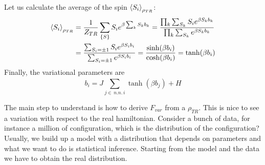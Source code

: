 \documentclass[../main/main.tex]{subfiles}
\begin{document}
Let us calculate the average of the spin \( \expval{S_i}_{\rho _{TR}} \):
\begin{equation*}
\begin{split}
\expval{S_i}_{\rho _{TR}}    &= \frac{1}{Z_{TR}} \sum_{\{ S \}  }^{} S_i e^{\beta \sum_{k}^{} S_k b_k } = \frac{\prod_{k}^{}  \sum_{S_k}^{} S_i e^{\beta S_k b_k}   }{\prod_{k}^{} \sum_{S_k}^{} e^{\beta S_k b_k}    }  \\
& = \frac{\sum_{S_i = \pm 1}^{} S_i e^{\beta S_i b_i}  }{\sum_{S_i = \pm 1}^{} e^{\beta S_i b_i}   } = \frac{\sinh (\beta b_i)}{\cosh (\beta b_i)} 
= \tanh (\beta b_i)
\end{split}
\end{equation*}
Finally, the variational parameters are 
\begin{equation}
  b_i = J \sum_{j \in \, n.n. \, i}^{} \tanh (\beta b_j) + H
\end{equation}
\begin{remark}
The main step to understand is how to derive \( F_{var} \) from a \( \rho _{TR} \).
This is nice to see a variation with respect to the real hamiltonian.
Consider a bunch of data, for instance a million of configuration, which is the distribution of the configuration? Usually, we build up a model with a distribution that depends on parameters and what we want to do is statistical inference. Starting from the model and the data we have to obtain the real distribution. 
\end{remark}
\end{document}
